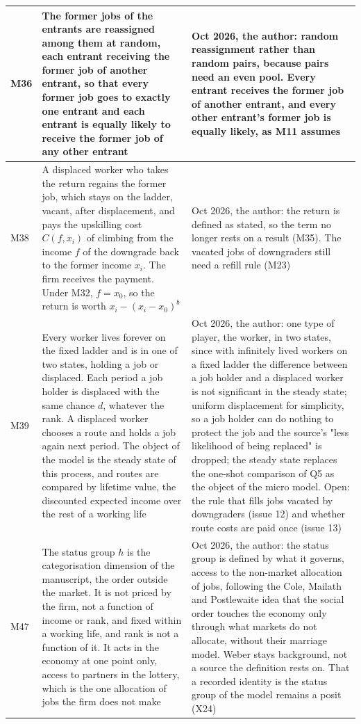 \documentclass[10pt]{article}
\begin{document}
{\begin{longtable}{>{\raggedright\arraybackslash}p{0.9cm} >{\raggedright\arraybackslash}p{9.0cm} >{\raggedright\arraybackslash}p{13.0cm}}
M36 & The former jobs of the entrants are reassigned among them at random, each entrant receiving the former job of another entrant, so that every former job goes to exactly one entrant and each entrant is equally likely to receive the former job of any other entrant & 12 Oct 2026, the author: random reassignment rather than random pairs, because pairs need an even pool. Every entrant receives the former job of another entrant, and every other entrant's former job is equally likely, as M11 assumes \\ \midrule
M38 & A displaced worker who takes the return regains the former job, which stays on the ladder, vacant, after displacement, and pays the upskilling cost $C(f,x_i)$ of climbing from the income $f$ of the downgrade back to the former income $x_i$. The firm receives the payment. Under M32, $f=x_0$, so the return is worth $x_i-(x_i-x_0)^b$ & 14 Oct 2026, the author: the return is defined as stated, so the term no longer rests on a result (M35). The vacated jobs of downgraders still need a refill rule (M23) \\ \midrule
M39 & Every worker lives forever on the fixed ladder and is in one of two states, holding a job or displaced. Each period a job holder is displaced with the same chance $d$, whatever the rank. A displaced worker chooses a route and holds a job again next period. The object of the model is the steady state of this process, and routes are compared by lifetime value, the discounted expected income over the rest of a working life & 14 Oct 2026, the author: one type of player, the worker, in two states, since with infinitely lived workers on a fixed ladder the difference between a job holder and a displaced worker is not significant in the steady state; uniform displacement for simplicity, so a job holder can do nothing to protect the job and the source's "less likelihood of being replaced" is dropped; the steady state replaces the one-shot comparison of Q5 as the object of the micro model. Open: the rule that fills jobs vacated by downgraders (issue 12) and whether route costs are paid once (issue 13) \\ \midrule
M47 & The status group $h$ is the categorisation dimension of the manuscript, the order outside the market. It is not priced by the firm, not a function of income or rank, and fixed within a working life, and rank is not a function of it. It acts in the economy at one point only, access to partners in the lottery, which is the one allocation of jobs the firm does not make & 16 Oct 2026, the author: the status group is defined by what it governs, access to the non-market allocation of jobs, following the Cole, Mailath and Postlewaite idea that the social order touches the economy only through what markets do not allocate, without their marriage model. Weber stays background, not a source the definition rests on. That a recorded identity is the status group of the model remains a posit (X24) \\ \midrule

\end{longtable}}
\end{document}
